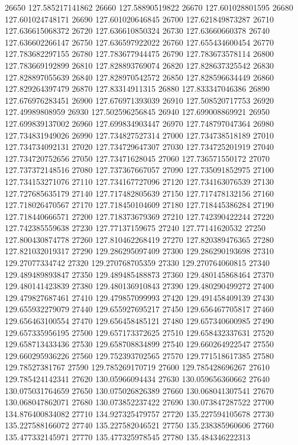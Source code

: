{26650 127.585217141862
26660 127.58890519822
26670 127.601028801595
26680 127.601024748171
26690 127.601020646845
26700 127.621849873287
26710 127.636615068372
26720 127.636610850324
26730 127.63660660378
26740 127.636602266147
26750 127.636597922022
26760 127.655434600454
26770 127.783682297155
26780 127.783677944475
26790 127.783673578114
26800 127.783669192899
26810 127.828893769074
26820 127.828637325542
26830 127.828897055639
26840 127.828970542572
26850 127.828596634449
26860 127.829264397479
26870 127.83314911315
26880 127.833347046386
26890 127.676976283451
26900 127.676971393039
26910 127.508520717753
26920 127.49989808959
26930 127.502596256845
26940 127.699008869921
26950 127.699839137002
26960 127.699834903447
26970 127.748797047364
26980 127.734831949026
26990 127.734827527314
27000 127.734738518189
27010 127.734734092131
27020 127.734729647307
27030 127.734725201919
27040 127.734720752656
27050 127.73471628045
27060 127.736571550172
27070 127.737372148516
27080 127.737367667057
27090 127.735091852975
27100 127.734153271076
27110 127.734167727096
27120 127.734163076539
27130 127.727685635179
27140 127.717482805639
27150 127.717478132156
27160 127.718026470567
27170 127.718450104609
27180 127.718445386284
27190 127.718440666571
27200 127.718373679369
27210 127.742390422244
27220 127.742385559638
27230 127.77137159675
27240 127.77141620532
27250 127.800430874778
27260 127.810462268419
27270 127.820389476365
27280 127.821032019317
27290 129.286295097409
27300 129.286290193698
27310 129.27077334742
27320 129.270768705359
27330 129.270764060815
27340 129.489489893847
27350 129.489485488873
27360 129.480145868464
27370 129.480141423839
27380 129.480136910843
27390 129.480290499272
27400 129.479827687461
27410 129.479857099993
27420 129.491458409139
27430 129.655932279079
27440 129.655927695217
27450 129.656467705817
27460 129.656463100554
27470 129.656458485121
27480 129.657340600985
27490 129.657335956195
27500 129.657173372625
27510 129.658432337631
27520 129.658713433436
27530 129.658708834899
27540 129.660264922547
27550 129.660295936226
27560 129.752393702565
27570 129.771518617385
27580 129.78527381767
27590 129.785269170719
27600 129.785428696267
27610 129.785424142341
27620 130.05966094434
27630 130.059656360662
27640 130.075031764659
27650 130.075026826389
27660 130.068041307541
27670 130.068047862071
27680 130.073852237422
27690 130.073847287522
27700 134.876400834082
27710 134.927325479757
27720 135.227594105678
27730 135.227588166072
27740 135.227582046521
27750 135.238385960606
27760 135.477332145971
27770 135.477325978545
27780 135.484346222313
}
